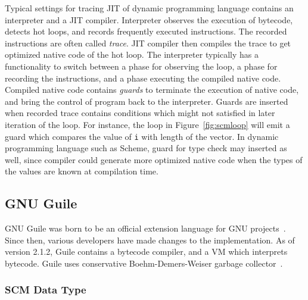 \documentclass[preprint, 10pt]{sigplanconf}
\begin{document}
Typical settings for tracing JIT of dynamic programming language contains an
interpreter and a JIT compiler. Interpreter observes the execution of bytecode,
detects hot loops, and records frequently executed instructions. The recorded
instructions are often called \textit{trace}. JIT compiler then compiles the
trace to get optimized native code of the hot loop. The interpreter typically
has a functionality to switch between a phase for observing the loop, a phase
for recording the instructions, and a phase executing the compiled native code.
Compiled native code contains \textit{guards} to terminate the execution of
native code, and bring the control of program back to the interpreter. Guards
are inserted when recorded trace contains conditions which might not satisfied
in later iteration of the loop. For instance, the loop in
Figure~\hyperref[fig:scmloop]{\ref{fig:scmloop}} will emit a guard which
compares the value of \texttt{i} with length of the vector. In dynamic
programming language such as Scheme, guard for type check may inserted as well,
since compiler could generate more optimized native code when the types of the
values are known at compilation time.

\subsection{GNU Guile}
\label{sec:backgroundguile}

GNU Guile was born to be an official extension language for GNU
projects~\cite{Galassi02guilereference}. Since then, various developers have
made changes to the implementation. As of version 2.1.2, Guile contains a
bytecode compiler, and a VM which interprets bytecode. Guile uses conservative
Boehm-Demers-Weiser garbage collector~\cite{boehm1988garbage}.


\subsubsection{SCM Data Type}
\label{sec:scmdatatype}
\end{document}
